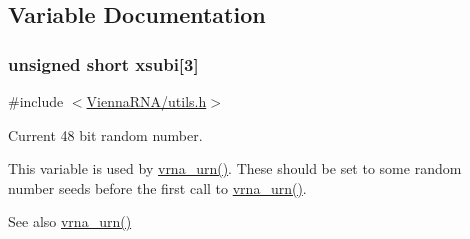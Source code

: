 \subsection{Variable Documentation}
\subsubsection[{\texorpdfstring{xsubi}{xsubi}}]{\setlength{\rightskip}{0pt plus 5cm}unsigned short xsubi\mbox{[}3\mbox{]}}\hypertarget{group__utils_gaf9a866c8417afda7368bbac939ab3c47}{}\label{group__utils_gaf9a866c8417afda7368bbac939ab3c47}


{\ttfamily \#include $<$\hyperlink{utils_8h}{Vienna\+R\+N\+A/utils.\+h}$>$}



Current 48 bit random number. 

This variable is used by \hyperlink{group__utils_ga384e256ebb295d04a14426179db0dd6e}{vrna\+\_\+urn()}. These should be set to some random number seeds before the first call to \hyperlink{group__utils_ga384e256ebb295d04a14426179db0dd6e}{vrna\+\_\+urn()}.

\begin{DoxySeeAlso}{See also}
\hyperlink{group__utils_ga384e256ebb295d04a14426179db0dd6e}{vrna\+\_\+urn()} 
\end{DoxySeeAlso}
